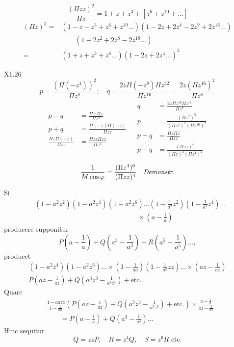 \begin{equation*}\tag*{3)}\frac{(\Pi zz)^2}{\Pi z}=1+z+z^3+[z^6+z^{10}+\ldots]\end{equation*}
{\small
\[\begin{aligned}
(\Pi z)^3={}&(1-z-z^3+z^6+z^{10}\ldots)(1-2z+2z^4-2z^9+2z^{16}\ldots)\\
&\qquad(1-2z^2+2z^8-2z^{18}\ldots)\\
={}&(1+z+z^3+z^6\ldots)(1-2z+2z^4\ldots)^2
\end{aligned}\]}
\par\noindent X1.\hfill26
\clearpage
{}
\[p=\frac{(\Pi(-z^4))^2}{\Pi z^8};\quad
q=\frac{2z\Pi(-z^8)\Pi z^{32}}{\Pi z^{16}}=\frac{2z(\Pi z^{16})^2}{\Pi z^8}\]
\[\begin{array}{c|c}
\begin{aligned}
p-q&=\frac{\Pi z.\Pi z}{\Pi z^2}\\[.8em]
p+q&=\frac{\Pi(-z)\Pi(-z)}{\Pi zz}\\[.8em]
\frac{\Pi z\Pi(-z)}{\Pi zz}&=\frac{\Pi zz\Pi zz}{\Pi z^4}
\end{aligned}
&\begin{aligned}
q&=\frac{2z\Pi z^{16}\Pi z^{16}}{\Pi z^8}\\[.8em]
p&=\frac{(\Pi z^8)^5}{(\Pi z^4)^2(\Pi z^{16})^2}\\[.8em]
p-q&=\frac{\Pi z\Pi z}{\Pi zz}\\[.8em]
p+q&=\frac{(\Pi zz)^5}{(\Pi z)^2(\Pi z^4)^2}
\end{aligned}
\end{array}\]
\[\frac1{M\cos\varphi}=\frac{(\Pi z^4)^6}{(\Pi zz)^4}\quad\text{\textit{Demonstr.}}\]
\noindent [S.\ 41]
\par\indent Si
\[\begin{aligned}
&(1-a^2z^2)(1-a^2z^4)(1-a^2z^6)\ldots\left(1-\frac1{a^2}z^2\right)\left(1-\frac1{a^2}z^4\right)\ldots\\
&\hspace{15em}\times\left(a-\frac1a\right)
\end{aligned}\]
\noindent producere supponitur
\[P\left(a-\frac1a\right)+Q\left(a^3-\frac1{a^3}\right)+R\left(a^5-\frac1{a^5}\right)\ldots,\]
\noindent producet
{\small
\[\begin{gathered}
(1-a^2z^4)(1-a^2z^6)\ldots\times\left(1-\frac1{aa}\right)\left(1-\frac1{a^2}zz\right)\ldots\times\left(az-\frac1{az}\right)\\
P\left(az-\frac1{az}\right)+Q\left(a^3z^3-\frac1{a^3z^3}\right)+\text{etc.}
\end{gathered}\]}
\noindent Quare
\[\begin{aligned}
&\frac{1-aazz}{1-\frac1{aa}}\left(P\left(az-\frac1{az}\right)+Q\left(a^3z^3-\frac1{a^3z^3}\right)+\text{etc.}\right)
\times\frac{a-\frac1a}{az-\frac1{az}}\\
&\qquad=P\left(a-\frac1a\right)+Q\left(a^3-\frac1{a^3}\right)\ldots
\end{aligned}\]
\noindent Hinc sequitur
\[Q=zzP,\quad R=z^4Q,\quad S=z^6R\text{ etc.}\]
\ClosingRule
\clearpage\endgroup
